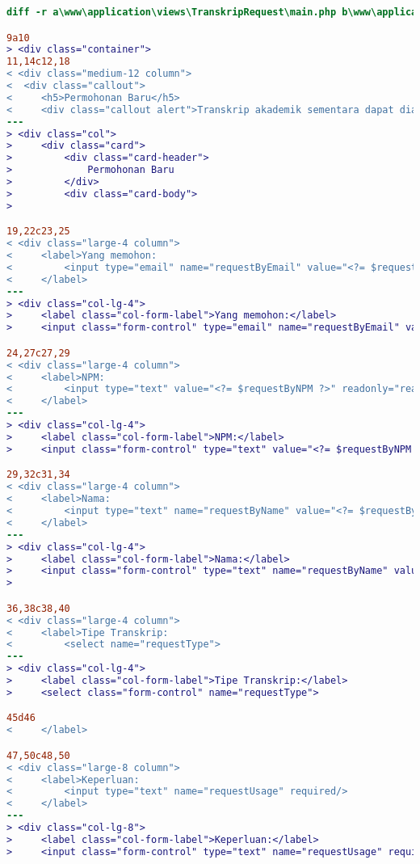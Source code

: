 \begin{lstlisting}[language=diff, caption=Perubahan file \path{\views\TranskripRequest\main.php} ,  basicstyle=\ttfamily, frame=single,
columns=fullflexible, keepspaces=true, breaklines=true, label={lst:mainTranskripRequest}]
diff -r a\www\application\views\TranskripRequest\main.php b\www\application\views\TranskripRequest\main.php

9a10
> <div class="container">
11,14c12,18
< <div class="medium-12 column">
<  <div class="callout">
<     <h5>Permohonan Baru</h5>
<     <div class="callout alert">Transkrip akademik sementara dapat diakses via student portal masing-masing.</div>
---
> <div class="col">
>     <div class="card">
>         <div class="card-header">
>             Permohonan Baru
>         </div>
>         <div class="card-body">
> 

19,22c23,25
< <div class="large-4 column">
<     <label>Yang memohon:
<         <input type="email" name="requestByEmail" value="<?= $requestByEmail ?>" readonly="readonly"/>
<     </label>
---
> <div class="col-lg-4">
>     <label class="col-form-label">Yang memohon:</label>
>     <input class="form-control" type="email" name="requestByEmail" value="<?= $requestByEmail ?>" readonly/>

24,27c27,29
< <div class="large-4 column">
<     <label>NPM:
<         <input type="text" value="<?= $requestByNPM ?>" readonly="readonly"/>
<     </label>
---
> <div class="col-lg-4">
>     <label class="col-form-label">NPM:</label>
>     <input class="form-control" type="text" value="<?= $requestByNPM ?>" readonly/>

29,32c31,34
< <div class="large-4 column">
<     <label>Nama:
<         <input type="text" name="requestByName" value="<?= $requestByName ?>" readonly="readonly"/>
<     </label>
---
> <div class="col-lg-4">
>     <label class="col-form-label">Nama:</label>
>     <input class="form-control" type="text" name="requestByName" value="<?= $requestByName ?>" readonly/>
> 

36,38c38,40
< <div class="large-4 column">
<     <label>Tipe Transkrip:
<         <select name="requestType">
---
> <div class="col-lg-4">
>     <label class="col-form-label">Tipe Transkrip:</label>
>     <select class="form-control" name="requestType">

45d46
<     </label>

47,50c48,50
< <div class="large-8 column">
<     <label>Keperluan:
<         <input type="text" name="requestUsage" required/>
<     </label>
---
> <div class="col-lg-8">
>     <label class="col-form-label">Keperluan:</label>
>     <input class="form-control" type="text" name="requestUsage" required/>


\end{lstlisting}
